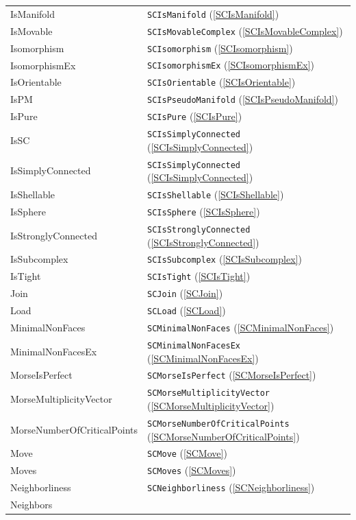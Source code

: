 \documentclass[a4paper,11pt]{report}
\begin{document}
{{ \begin{center}
\begin{tabular}{ll}IsManifold&
\texttt{SCIsManifold} (\ref{SCIsManifold})\\
IsMovable&
\texttt{SCIsMovableComplex} (\ref{SCIsMovableComplex})\\
Isomorphism&
\texttt{SCIsomorphism} (\ref{SCIsomorphism})\\
IsomorphismEx&
\texttt{SCIsomorphismEx} (\ref{SCIsomorphismEx})\\
IsOrientable&
\texttt{SCIsOrientable} (\ref{SCIsOrientable})\\
IsPM&
\texttt{SCIsPseudoManifold} (\ref{SCIsPseudoManifold})\\
IsPure&
\texttt{SCIsPure} (\ref{SCIsPure})\\
IsSC&
\texttt{SCIsSimplyConnected} (\ref{SCIsSimplyConnected})\\
IsSimplyConnected&
\texttt{SCIsSimplyConnected} (\ref{SCIsSimplyConnected})\\
IsShellable&
\texttt{SCIsShellable} (\ref{SCIsShellable})\\
IsSphere&
\texttt{SCIsSphere} (\ref{SCIsSphere})\\
IsStronglyConnected&
\texttt{SCIsStronglyConnected} (\ref{SCIsStronglyConnected})\\
IsSubcomplex&
\texttt{SCIsSubcomplex} (\ref{SCIsSubcomplex})\\
IsTight&
\texttt{SCIsTight} (\ref{SCIsTight})\\
Join&
\texttt{SCJoin} (\ref{SCJoin})\\
Load&
\texttt{SCLoad} (\ref{SCLoad})\\
MinimalNonFaces&
\texttt{SCMinimalNonFaces} (\ref{SCMinimalNonFaces})\\
MinimalNonFacesEx&
\texttt{SCMinimalNonFacesEx} (\ref{SCMinimalNonFacesEx})\\
MorseIsPerfect&
\texttt{SCMorseIsPerfect} (\ref{SCMorseIsPerfect})\\
MorseMultiplicityVector&
\texttt{SCMorseMultiplicityVector} (\ref{SCMorseMultiplicityVector})\\
MorseNumberOfCriticalPoints&
\texttt{SCMorseNumberOfCriticalPoints} (\ref{SCMorseNumberOfCriticalPoints})\\
Move&
\texttt{SCMove} (\ref{SCMove})\\
Moves&
\texttt{SCMoves} (\ref{SCMoves})\\
Neighborliness&
\texttt{SCNeighborliness} (\ref{SCNeighborliness})\\
Neighbors&

\end{tabular}
\end{center}}}
\end{document}
